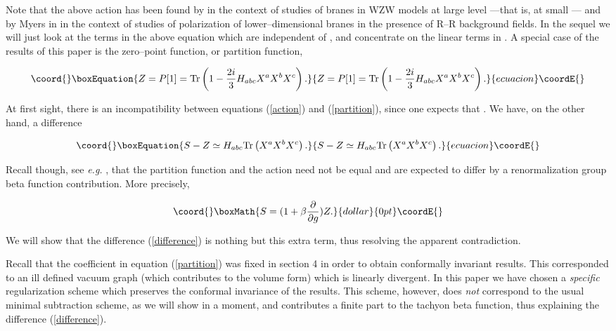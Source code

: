 \documentclass[a4paper,11pt]{article}
\begin{document}
\noindent
Note that the above action has been found by \cite{ARS-1, ARS-2} in the 
context of studies of branes in WZW models at large level \coordHE{} ---that is, 
at small \coordHE{}--- and by Myers in \cite{Myers} in the 
context of studies of polarization of lower--dimensional branes in the 
presence of R--R background fields. In the sequel we will just look at the 
terms in the above equation which are independent of \coordHE{}, and 
concentrate on the linear terms in \coordHE{}. A special case of the results 
of this paper is the zero--point function, or partition function,

\begin{equation}\coord{}\boxEquation{ \label{partition}
Z = P[1] =  {\rm Tr} \left(1 - \frac{2i}{3} H_{abc} X^a X^b X^c 
\right) .
}{ Z = P[1] =  {\rm Tr} \left(1 - \frac{2i}{3} H_{abc} X^a X^b X^c 
\right) .
}{ecuacion}\coordE{}\end{equation}

\noindent
At first sight, there is an incompatibility between equations 
(\ref{action}) and (\ref{partition}), since one expects that \coordHE{}.
We have, on the other hand, a difference

\begin{equation}\coord{}\boxEquation{ \label{difference}
S-Z \simeq   H_{abc} {\rm Tr} \left(X^a X^b X^c \right) .
}{ S-Z \simeq   H_{abc} {\rm Tr} \left(X^a X^b X^c \right) .
}{ecuacion}\coordE{}\end{equation}

\noindent
Recall though, see \textit{e.g.} \cite{Witten-BSFT, Shatashvili-BSFT, 
Tseytlin-BSFT}, that the partition function and the action need not be 
equal and are expected to differ by a renormalization group beta 
function contribution. More precisely,

$$\coord{}\boxMath{
S = (1+\beta\frac{\partial}{\partial g}) Z .
}{dollar}{0pt}\coordE{}$$

\noindent
We will show that the difference (\ref{difference}) is nothing but this 
extra term, thus resolving the apparent contradiction.

Recall that the coefficient \coordHE{} in equation (\ref{partition}) was fixed 
in section 4 in order to obtain conformally invariant results. This 
corresponded to an ill defined vacuum graph (which contributes to the
volume form) which is 
linearly divergent. In this paper we have chosen a {\it specific} 
regularization scheme which preserves the conformal invariance of 
the results. This scheme, however, does {\it not} correspond to the usual 
minimal subtraction scheme, as we will show in a moment, and contributes a 
finite part to the tachyon beta function, thus explaining the 
difference (\ref{difference}).
\end{document}
